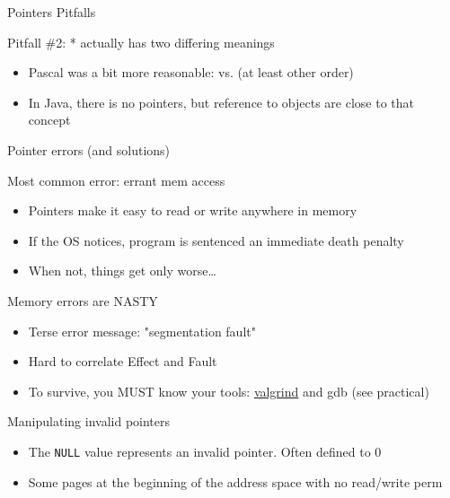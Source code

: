 \begin{Coupe}
\begin{frame}{Pointers Pitfalls}
\begin{block}{Pitfall \#2: * actually has two differing meanings}
\begin{itemize}
    \item Pascal was a bit more reasonable: 
      vs.  {\small(at least other order)}
    \item In Java, there is no pointers, but reference to objects are close to
      that concept
    \end{itemize}
  \end{block}
\end{frame}
\begin{frame}{Pointer errors (and solutions)}
  \begin{block}{Most common error: errant mem access}
    \begin{itemize}
    \item Pointers make it easy to read or write anywhere in memory
    \item If the OS notices, program is sentenced an immediate death penalty
    \item When not, things get only worse\ldots
    \end{itemize}
  \end{block}
  \begin{block}{Memory errors are NASTY}
    \begin{itemize}
    \item Terse error message: "segmentation fault"
    \item Hard to correlate Effect and Fault
    \item To survive, you MUST know your tools: \underline{valgrind}
      and gdb (see practical)
    \end{itemize}
  \end{block}
  \begin{block}{Manipulating invalid pointers}
    \begin{itemize}
    \item The \texttt{NULL} value represents an invalid pointer. Often
      defined to 0
    \item Some pages at the beginning of the address space with no
      read/write perm
    \end{itemize}
  \end{block}
\end{frame}

\end{Coupe}
